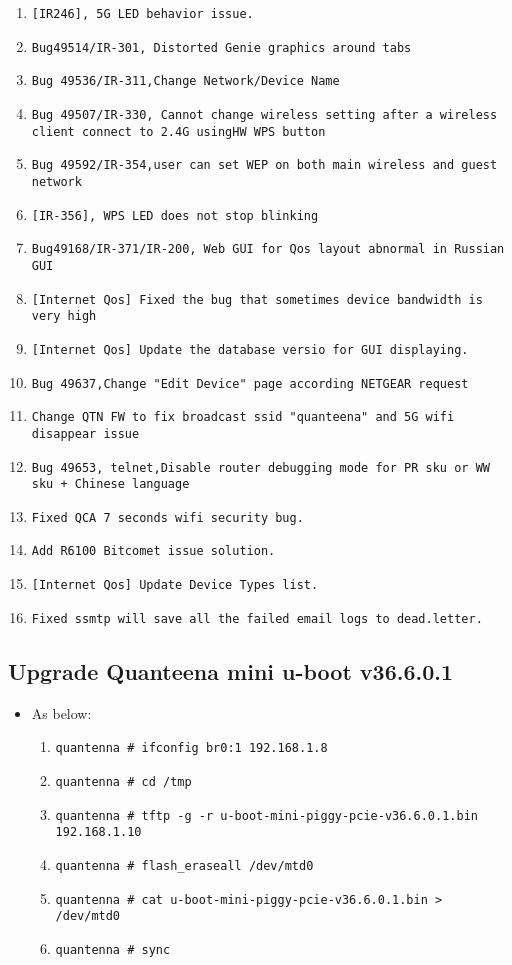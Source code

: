 \documentclass[12pt]{report}
\begin{document}
\begin{itemize}
\begin{enumerate}
		\item \texttt{[IR246], 5G LED behavior issue.}
		\item \texttt{Bug49514/IR-301, Distorted Genie graphics around tabs}
		\item \texttt{Bug 49536/IR-311,Change Network/Device Name}
		\item \texttt{Bug 49507/IR-330, Cannot change wireless setting after a wireless client connect to 2.4G usingHW WPS button}
		\item \texttt{Bug 49592/IR-354,user can set WEP on both main wireless and guest network }
		\item \texttt{[IR-356], WPS LED does not stop blinking}
		\item \texttt{Bug49168/IR-371/IR-200, Web GUI for Qos layout abnormal in Russian GUI}
		\item \texttt{[Internet Qos] Fixed the bug that sometimes device bandwidth is very high}
		\item \texttt{[Internet Qos] Update the database versio for GUI displaying.}
		\item \texttt{Bug 49637,Change "Edit Device" page according NETGEAR request}
		\item \texttt{Change QTN FW to fix broadcast ssid "quanteena" and 5G wifi disappear issue }
		\item \texttt{Bug 49653, telnet,Disable router debugging mode for PR sku or WW sku + Chinese language}
		\item \texttt{Fixed QCA 7 seconds wifi security bug.}
		\item \texttt{Add R6100 Bitcomet issue solution.}
		\item \texttt{[Internet Qos] Update Device Types list.}
		\item \texttt{Fixed ssmtp will save all the failed email logs to dead.letter.}

    	\end{enumerate}
    \end{itemize}

    \subsection{Upgrade Quanteena mini u-boot v36.6.0.1}
    \begin{itemize}
    \item As below:
    	\begin{enumerate}
		\item \texttt{quantenna \# ifconfig br0:1 192.168.1.8}
		\item \texttt{quantenna \# cd /tmp}
		\item \texttt{quantenna \# tftp -g -r u-boot-mini-piggy-pcie-v36.6.0.1.bin 192.168.1.10}
		\item \texttt{quantenna \# flash\_eraseall /dev/mtd0}
		\item \texttt{quantenna \# cat u-boot-mini-piggy-pcie-v36.6.0.1.bin > /dev/mtd0}
		\item \texttt{quantenna \# sync}
    	\end{enumerate}
    \end{itemize}
\end{document}
